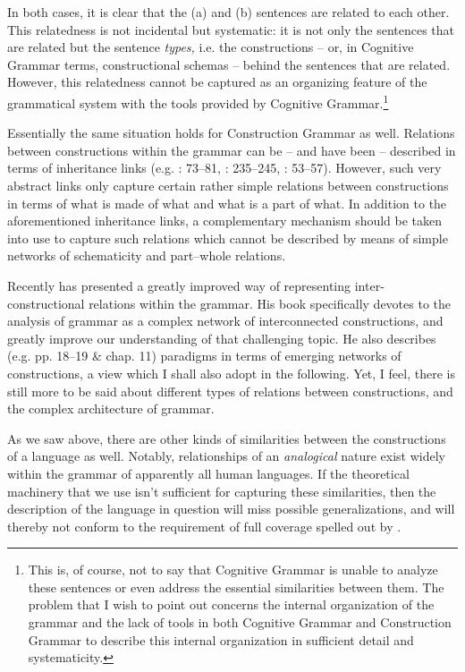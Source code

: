 \documentclass[output=paper, colorlinks,citecolor=brown]{langsci/langscibook}
\begin{document}
In both cases, it is clear that the (a) and (b) sentences are related to each other. This relatedness is not incidental but systematic: it is not only the sentences that are related but the sentence \textit{types,} i.e. the constructions -- or, in Cognitive Grammar terms, constructional schemas -- behind the sentences that are related. However, this relatedness cannot be captured as an organizing feature of the grammatical system with the tools provided by Cognitive Grammar.\footnote{This is, of course, not to say that Cognitive Grammar is unable to analyze these sentences or even address the essential similarities between them. The problem that I wish to point out concerns the internal organization of the grammar and the lack of tools in both Cognitive Grammar and Construction Grammar to describe this internal organization in sufficient detail and systematicity.}

Essentially the same situation holds for Construction Grammar as well. Relations between constructions within the grammar can be -- and have been -- described in terms of inheritance links (e.g. \citealt{Goldberg1995}: 73–81, \citealt{MichaelisLambrecht1996}: 235–245, \citealt{Croft2001}: 53–57). However, such very abstract links only capture certain rather simple relations between constructions in terms of what is made of what and what is a part of what. In addition to the aforementioned inheritance links, a complementary mechanism should be taken into use to capture such relations which cannot be described by means of simple networks of schematicity and part–whole relations.

Recently \citet{Diessel2019} has presented a greatly improved way of representing inter-constructional relations within the grammar. His book specifically devotes to the analysis of grammar as a complex network of interconnected constructions, and greatly improve our understanding of that challenging topic. He also describes (e.g. pp. 18–19 \& chap. 11) paradigms in terms of emerging networks of constructions, a view which I shall also adopt in the following. Yet, I feel, there is still more to be said about different types of relations between constructions, and the complex architecture of grammar.

As we saw above, there are other kinds of similarities between the constructions of a language as well. Notably, relationships of an \textit{analogical} nature exist widely within the grammar of apparently all human languages. If the theoretical machinery that we use isn’t sufficient for capturing these similarities, then the description of the language in question will miss possible generalizations, and will thereby not conform to the requirement of full coverage spelled out by \citet{Kay1995}.
\end{document}
